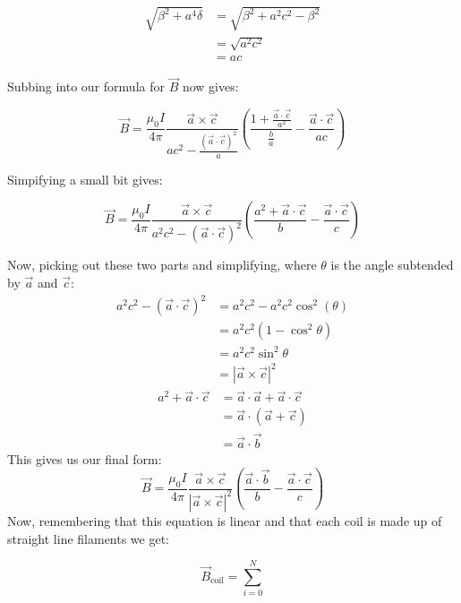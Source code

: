 \documentclass[12pt,a4paper]{report}
\begin{document}
\begin{align*}
  \sqrt{\beta^2 + a^4 \delta} &= \sqrt{\beta^2 + a^2c^2 - \beta^2} \\
                              &= \sqrt{a^2c^2} \\
                              &= ac
\end{align*}

Subbing into our formula for $\vec{B}$ now gives:

\begin{equation}
  \vec{B} = \frac{\mu_0 I}{4\pi} \frac{\vec{a}\times \vec{c}}{ac^2 - \frac{\left(\vec{a} \cdot \vec{c}\right)^2}{a}} \left( \frac{1 + \frac{\vec{a}\cdot{\vec{c}}}{a^2}}{\frac{b}{a}} - \frac{\vec{a} \cdot \vec{c}}{ac} \right)
\end{equation}

Simpifying a small bit gives:

\begin{equation}
\vec{B} = \frac{\mu_0 I}{4\pi} \frac{\vec{a}\times \vec{c}}{a^2c^2 - \left(\vec{a} \cdot \vec{c}\right)^2} \left( \frac{a^2 + \vec{a}\cdot\vec{c}}{b} - \frac{\vec{a} \cdot \vec{c}}{c} \right)
\end{equation}

Now, picking out these two parts and simplifying, where $\theta$ is the angle subtended by $\vec{a}$ and $\vec{c}$:
\begin{align*}
  a^2c^2 - \left( \vec{a} \cdot \vec{c} \right)^2 &= a^2c^2 - a^2c^2\cos^2(\theta) \\
                               &= a^2c^2(1 - \cos^2\theta) \\
                               &= a^2c^2\sin^2\theta \\
                               &= \left \vert \vec{a} \times \vec{c} \right \vert ^2
\end{align*}
\begin{align*}
  a^2 + \vec{a} \cdot \vec{c} &= \vec{a} \cdot \vec{a} + \vec{a} \cdot \vec{c} \\
                              &= \vec{a} \cdot \left(\vec{a} + \vec{c}\right) \\
                              &= \vec{a} \cdot \vec{b}
\end{align*}
This gives us our final form:
\begin{equation}\label{eq:backwards}
  \vec{B} = \frac{\mu_0 I}{4\pi} \frac{\vec{a} \times \vec{c}}{\left \vert \vec{a} \times \vec{c} \right \vert^2 } \left( \frac{\vec{a} \cdot \vec{b}}{b} - \frac{\vec{a} \cdot \vec{c}}{c} \right)
\end{equation}
Now, remembering that this equation is linear and that each coil is made up of straight line filaments we get:

\begin{equation}
  \vec{B}_{\text{coil}} = \sum_{i = 0}^N  
\end{equation}
\end{document}
